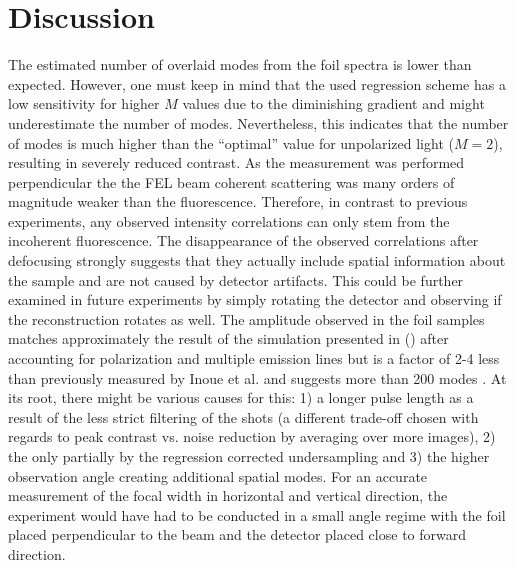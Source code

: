 \section{Discussion}
The estimated number of overlaid modes from the foil spectra is lower than expected. However, one must keep in mind that the used regression scheme has a low sensitivity for higher $M$ values due to the diminishing gradient and might underestimate the number of modes. Nevertheless, this indicates that the number of modes is much higher than the \enquote{optimal} value for unpolarized light ($M=2$), resulting in severely reduced contrast. 
As the measurement was performed perpendicular the the FEL beam coherent scattering was many orders of magnitude weaker than the fluorescence.  Therefore, in contrast to previous experiments, any observed intensity correlations can only stem from the incoherent fluorescence.
The disappearance of the observed correlations after defocusing strongly suggests that they actually include spatial information about the sample and are not caused by detector artifacts. This could be further examined in future experiments by simply rotating the detector and observing if the reconstruction rotates as well. The amplitude observed in the foil samples matches approximately the result of the simulation presented in   () after accounting for polarization and multiple emission lines but is a factor of 2-4 less than previously measured by Inoue et al. and suggests more than 200 modes \cite{inoue2019}. At its root, there might be various causes for this: 1) a longer pulse length as a result of the less strict filtering of the shots (a different trade-off chosen with regards to peak contrast vs. noise reduction by averaging over more images), 2) the only partially by the regression corrected undersampling and 3) the higher observation angle creating additional spatial modes. For an accurate measurement of the focal width in horizontal and vertical direction, the experiment would have had to be conducted in a small angle regime with the foil placed perpendicular to the beam and the detector placed close to forward direction. 

